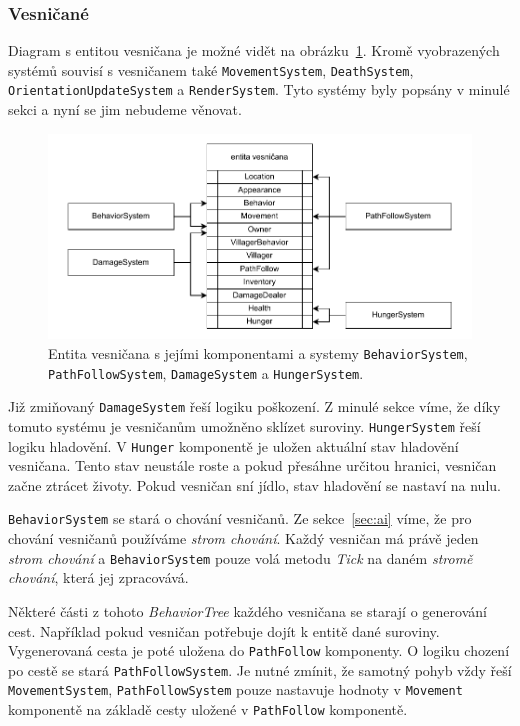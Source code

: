 \subsubsection{Vesničané}
Diagram s entitou vesničana je možné vidět na obrázku~\ref{fig:villager}. Kromě vyobrazených systémů souvisí s vesničanem také \texttt{MovementSystem}, \texttt{DeathSystem}, \texttt{OrientationUpdateSystem} a \texttt{RenderSystem}. Tyto systémy byly popsány v minulé sekci a nyní se jim nebudeme věnovat.

\begin{figure}[!htb]
  \centering
  \includegraphics[width=1.0\linewidth]{img/villager.pdf}
  \caption{Entita vesničana s jejími komponentami a systemy \texttt{BehaviorSystem}, \texttt{PathFollowSystem}, \texttt{DamageSystem} a \texttt{HungerSystem}.}
  \label{fig:villager}
\end{figure}

Již zmiňovaný \texttt{DamageSystem} řeší logiku poškození. Z minulé sekce víme, že díky tomuto systému je vesničanům umožněno sklízet suroviny. \texttt{HungerSystem} řeší logiku hladovění. V \texttt{Hunger} komponentě je uložen aktuální stav hladovění vesničana. Tento stav neustále roste a pokud přesáhne určitou hranici, vesničan začne ztrácet životy. Pokud vesničan sní jídlo, stav hladovění se nastaví na nulu.

\texttt{BehaviorSystem} se stará o chování vesničanů. Ze sekce~\ref{sec:ai} víme, že pro chování vesničanů používáme \textit{strom chování}. Každý vesničan má právě jeden \textit{strom chování} a \texttt{BehaviorSystem} pouze volá metodu \textit{Tick} na daném \textit{stromě chování}, která jej zpracovává.

Některé části z tohoto \textit{BehaviorTree} každého vesničana se starají o generování cest. Například pokud vesničan potřebuje dojít k entitě dané suroviny. Vygenerovaná cesta je poté uložena do \texttt{PathFollow} komponenty. O logiku chození po cestě se stará \texttt{PathFollowSystem}. Je nutné zmínit, že samotný pohyb vždy řeší \texttt{MovementSystem}, \texttt{PathFollowSystem} pouze nastavuje hodnoty v \texttt{Movement} komponentě na základě cesty uložené v \texttt{PathFollow} komponentě.

